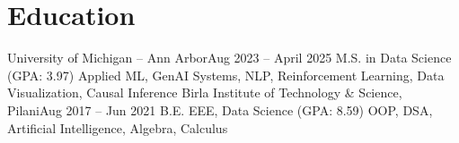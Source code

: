 

\section{Education}
\vspace{-10pt}
\resumeSubheadingEducation
  {University of Michigan – Ann Arbor}{Aug 2023 -- April 2025}
  {M.S. in Data Science (GPA: 3.97)}
  {Applied ML, GenAI Systems, NLP, Reinforcement Learning, Data Visualization, Causal Inference}
\vspace{2pt}
\resumeSubheadingEducation
  {Birla Institute of Technology \& Science, Pilani}{Aug 2017 -- Jun 2021}
  {B.E. EEE, Data Science (GPA: 8.59)}
  {OOP, DSA, Artificial Intelligence, Algebra, Calculus}
